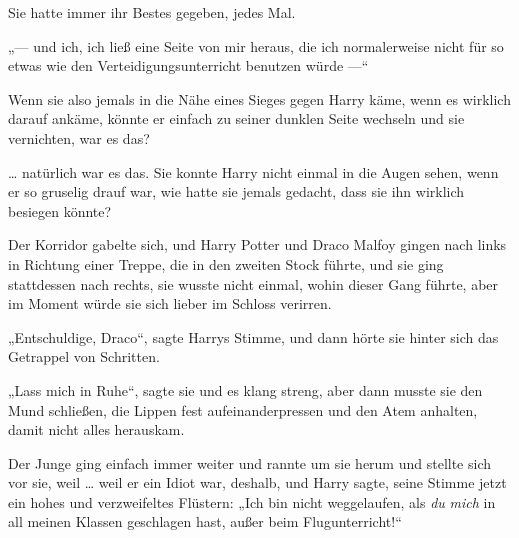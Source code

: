 Sie hatte immer ihr Bestes gegeben, jedes Mal.

„— und ich, ich ließ eine Seite von mir heraus, die ich normalerweise nicht für so etwas wie den Verteidigungsunterricht benutzen würde —“

Wenn sie also jemals in die Nähe eines Sieges gegen Harry käme, wenn es wirklich darauf ankäme, könnte er einfach zu seiner dunklen Seite wechseln und sie vernichten, war es das?

… natürlich war es das. Sie konnte Harry nicht einmal in die Augen sehen, wenn er so gruselig drauf war, wie hatte sie jemals gedacht, dass sie ihn wirklich besiegen könnte?

Der Korridor gabelte sich, und Harry Potter und Draco Malfoy gingen nach links in Richtung einer Treppe, die in den zweiten Stock führte, und sie ging stattdessen nach rechts, sie wusste nicht einmal, wohin dieser Gang führte, aber im Moment würde sie sich lieber im Schloss verirren.

„Entschuldige, Draco“, sagte Harrys Stimme, und dann hörte sie hinter sich das Getrappel von Schritten.

„Lass mich in Ruhe“, sagte sie und es klang streng, aber dann musste sie den Mund schließen, die Lippen fest aufeinanderpressen und den Atem anhalten, damit nicht alles herauskam.

Der Junge ging einfach immer weiter und rannte um sie herum und stellte sich vor sie, weil … weil er ein Idiot war, deshalb, und Harry sagte, seine Stimme jetzt ein hohes und verzweifeltes Flüstern:
„Ich bin nicht weggelaufen, als \emph{du} \emph{mich} in all meinen Klassen geschlagen hast, außer beim Flugunterricht!“

